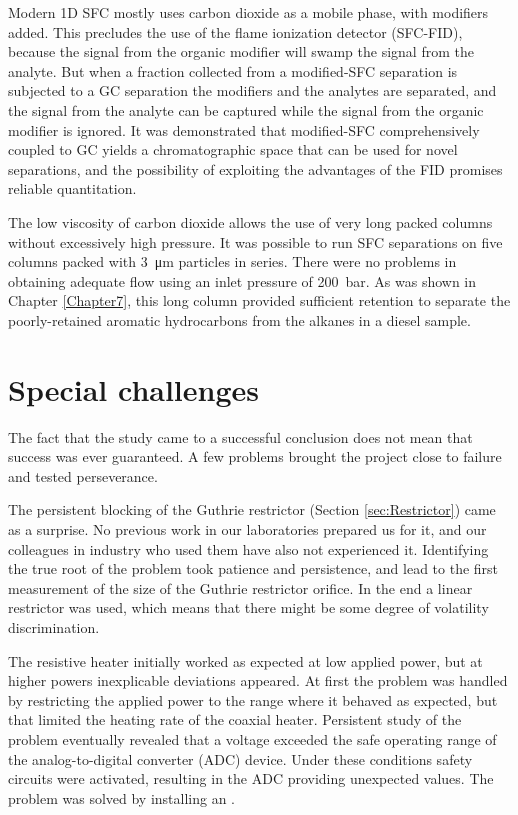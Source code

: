 Modern 1D SFC mostly uses carbon dioxide as a mobile phase, with modifiers
added. This precludes the use of the flame ionization detector (SFC-FID),
because the signal from the organic modifier will swamp the signal from the
analyte. But when a fraction collected from a modified-SFC separation is
subjected to a GC separation the modifiers and the analytes are separated, and
the signal from the analyte can be captured while the signal from the organic
modifier is ignored. It was demonstrated that modified-SFC comprehensively
coupled to GC yields a chromatographic space that can be used for novel
separations, and the possibility of exploiting the advantages of the FID
promises reliable quantitation.

The low viscosity of carbon dioxide allows the use of very long packed columns
without excessively high pressure. It was possible to run SFC separations on
five columns packed with \SI{3}{\micro\metre} particles in series. There were no
problems in obtaining adequate flow using an inlet pressure of \SI{200}{\bar}.
As was shown in Chapter \ref{Chapter7}, this long column provided sufficient
retention to separate the poorly-retained aromatic hydrocarbons from the alkanes
in a diesel sample.

\section{Special challenges}

The fact that the study came to a successful conclusion does not mean that
success was ever guaranteed. A few problems brought the project close to
failure and tested perseverance.

The persistent blocking of the Guthrie restrictor (Section \ref{sec:Restrictor})
came as a surprise. No previous work in our laboratories prepared us for it, and
our colleagues in industry who used them have also not experienced it.
Identifying the true root of the problem took patience and persistence, and lead
to the first measurement of the size of the Guthrie restrictor orifice. In the
end a linear restrictor was used, which means that there might be some degree of
volatility discrimination.

The resistive heater initially worked as expected at low applied power, but at
higher powers inexplicable deviations appeared. At first the problem was handled
by restricting the applied power to the range where it behaved as expected, but
that limited the heating rate of the coaxial heater. Persistent study of the
problem eventually revealed that a voltage exceeded the safe operating range of
the analog-to-digital converter (ADC) device. Under these conditions safety
circuits were activated, resulting in the ADC providing unexpected values. The
problem was solved by installing an .


